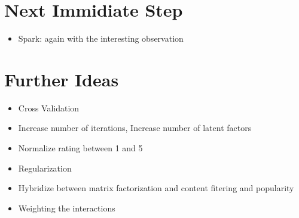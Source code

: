 \documentclass{article}
\begin{document}
 \section{Next Immidiate Step}
 \begin{itemize}
  \item Spark: again with the interesting observation
 \end{itemize}

 \section{Further Ideas}
 \begin{itemize}
  \item Cross Validation
  \item Increase number of iterations, Increase number of latent factors
  \item Normalize rating between 1 and 5
  \item Regularization
  \item Hybridize between matrix factorization and content fitering and popularity
  \item Weighting the interactions
 \end{itemize}

\end{document}
